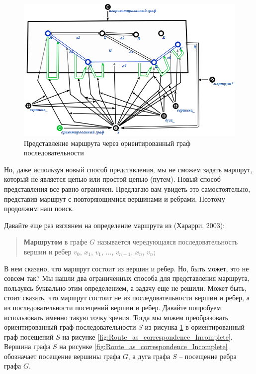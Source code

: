 \begin{figure}
  \centering
  \includegraphics[scale=0.8]{images/2/Route_as_sequence}
  \caption{Представление маршрута через ориентированный граф последовательности}
  \label{fig:Route_as_sequence}
\end{figure}

Но, даже используя новый способ представления, мы не сможем задать
маршрут, который не является цепью или простой цепью (путем). Новый
способ представления все равно ограничен. Предлагаю вам увидеть это
самостоятельно, представив маршрут с повторяющимися вершинами и
ребрами. Поэтому продолжим наш поиск.

Давайте еще раз взглянем на определение маршрута из (Харарри, 2003):

\begin{quotation}
  \textbf{Маршрутом} в графе $G$ называется чередующаяся
  последовательность вершин и ребер $v_0$, $x_1$, $v_1$, $\dotsc$, $v_{n-1}$,
  $x_n$, $v_n$;
\end{quotation}

В нем сказано, что маршрут состоит из вершин и ребер. Но, быть может,
это не совсем так? Мы нашли два ограниченных способа для представления
маршрута, пользуясь буквально этим определением, а задачу еще не
решили. Может быть, стоит сказать, что маршрут состоит не из
последовательности вершин и ребер, а из последовательности посещений
вершин и ребер. Давайте попробуем использовать именно такую точку
зрения. Тогда мы можем преобразовать ориентированный граф
последовательности $S$ из рисунка \ref{fig:Route_as_sequence} в
ориентированный граф посещений $S$ на рисунке
\ref{fig:Route_as_correspondence_Incomplete}. Вершина графа $S$ на
рисунке \ref{fig:Route_as_correspondence_Incomplete} обозначает
посещение вершины графа $G$, а дуга графа $S$ – посещение ребра графа
$G$.

